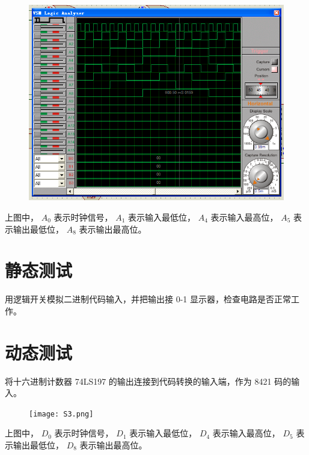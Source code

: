 \documentclass{article}
\begin{document}
\begin{figure}[!hbp]
  \centering
  \includegraphics[scale=0.45]{S2.png}
\end{figure}

上图中， $A_0$ 表示时钟信号， $A_1$ 表示输入最低位， $A_4$ 表示输入最高位， $A_5$ 表示输出最低位， $A_8$ 表示输出最高位。

\newpage

\section{静态测试}

用逻辑开关模拟二进制代码输入，并把输出接 0-1 显示器，检查电路是否正常工作。

\section{动态测试}

将十六进制计数器 74LS197 的输出连接到代码转换的输入端，作为 8421 码的输入。

\begin{figure}[!hbp]
  \centering
  \texttt{[image: S3.png]}
\end{figure}

上图中， $D_0$ 表示时钟信号， $D_1$ 表示输入最低位， $D_4$ 表示输入最高位， $D_5$ 表示输出最低位， $D_8$ 表示输出最高位。
\end{document}
